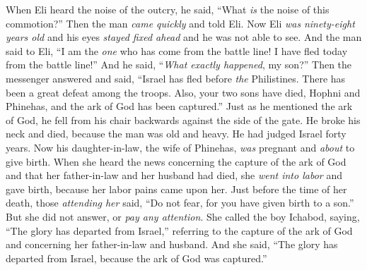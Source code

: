 \begin{biblechapter}
\verse When Eli heard the noise of the outcry, he said, “What \textit{is} the noise of this commotion?” Then the man \textit{came quickly} and told Eli.
\verse Now Eli \textit{was} \textit{ninety-eight years old} and his eyes \textit{stayed fixed ahead} and he was not able to see.
\verse And the man said to Eli, “I am the \textit{one} who has come from the battle line! I have fled today from the battle line!” And he said, “\textit{What exactly happened}, my son?”
\verse Then the messenger answered and said, “Israel has fled before \textit{the} Philistines. There has been a great defeat among the troops. Also, your two sons have died, Hophni and Phinehas, and the ark of God has been captured.”
\verse Just as he mentioned the ark of God, he fell from his chair backwards against the side of the gate. He broke his neck and died, because the man was old and heavy. He had judged Israel forty years.
\verse Now his daughter-in-law, the wife of Phinehas, \textit{was} pregnant and \textit{about} to give birth. When she heard the news concerning the capture of the ark of God and that her father-in-law and her husband had died, she \textit{went into labor} and gave birth, because her labor pains came upon her.
\verse Just before the time of her death, those \textit{attending her} said, “Do not fear, for you have given birth to a son.” But she did not answer, or \textit{pay any attention}.
\verse She called the boy Ichabod, saying, “The glory has departed from Israel,” referring to the capture of the ark of God and concerning her father-in-law and husband.
\verse And she said, “The glory has departed from Israel, because the ark of God was captured.”
\end{biblechapter}

